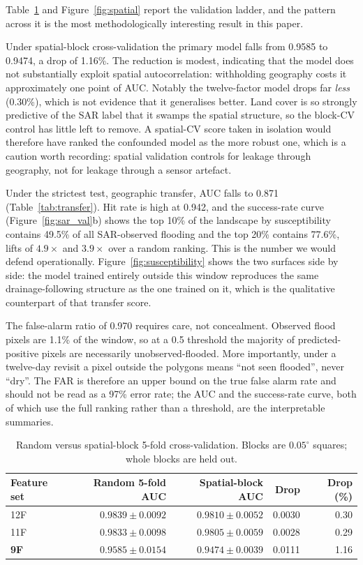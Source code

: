 \documentclass[11pt,a4paper]{article}
\begin{document}
Table~\ref{tab:spatial} and Figure~\ref{fig:spatial} report the validation
ladder, and the pattern across it is the most methodologically interesting result
in this paper.

Under spatial-block cross-validation the primary model falls from 0.9585 to
0.9474, a drop of 1.16\%. The reduction is modest, indicating that the model
does not substantially exploit spatial autocorrelation: withholding geography
costs it approximately one point of AUC. Notably the twelve-factor model drops far \emph{less}
(0.30\%), which is not evidence that it generalises better. Land cover is so
strongly predictive of the SAR label that it swamps the spatial structure, so the
block-CV control has little left to remove. A spatial-CV score taken in isolation
would therefore have ranked the confounded model as the more robust one, which is
a caution worth recording: spatial validation controls for leakage through
geography, not for leakage through a sensor artefact.

Under the strictest test, geographic transfer, AUC falls to 0.871
(Table~\ref{tab:transfer}). Hit rate is high at 0.942, and the success-rate curve
(Figure~\ref{fig:sar_val}b) shows the top 10\% of the landscape by susceptibility
contains 49.5\% of all SAR-observed flooding and the top 20\% contains 77.6\%,
lifts of $4.9\times$ and $3.9\times$ over a random ranking. This is the number we
would defend operationally. Figure~\ref{fig:susceptibility} shows the two
surfaces side by side: the model trained entirely outside this window
reproduces the same drainage-following structure as the one trained on it,
which is the qualitative counterpart of that transfer score.

The false-alarm ratio of 0.970 requires care, not concealment. Observed
flood pixels are 1.1\% of the window, so at a 0.5 threshold the majority of
predicted-positive pixels are necessarily unobserved-flooded. More importantly,
under a twelve-day revisit a pixel outside the polygons means ``not seen
flooded'', never ``dry''. The FAR is therefore an upper bound on the true false
alarm rate and should not be read as a 97\% error rate; the AUC and the
success-rate curve, both of which use the full ranking rather than a threshold,
are the interpretable summaries.

\begin{table}[t]
\centering
\caption{Random versus spatial-block 5-fold cross-validation. Blocks are
$0.05^\circ$ squares; whole blocks are held out.}
\label{tab:spatial}
\small
\begin{tabular}{@{}lrrrr@{}}
\toprule
\textbf{Feature set} & \textbf{Random 5-fold AUC} & \textbf{Spatial-block AUC} &
\textbf{Drop} & \textbf{Drop (\%)} \\
\midrule
12F & $0.9839\pm0.0092$ & $0.9810\pm0.0052$ & 0.0030 & 0.30 \\
11F & $0.9833\pm0.0098$ & $0.9805\pm0.0059$ & 0.0028 & 0.29 \\
\textbf{9F} & $0.9585\pm0.0154$ & $0.9474\pm0.0039$ & 0.0111 & 1.16 \\
\bottomrule
\end{tabular}
\end{table}
\end{document}
